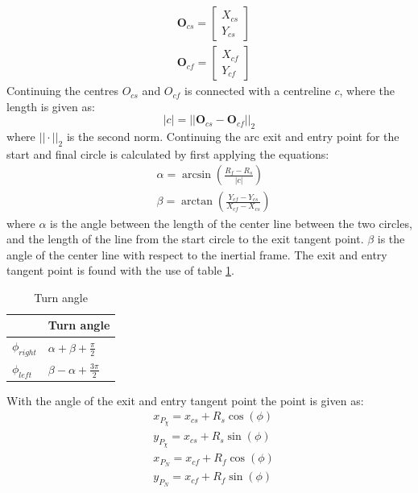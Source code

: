 \begin{align}
& \mathbf{O}_{cs} =
\begin{bmatrix}
X_{cs} \\
Y_{cs}
\end{bmatrix} \\
& \mathbf{O}_{cf} =
\begin{bmatrix}
X_{cf} \\
Y_{cf}
\end{bmatrix}
\end{align}
Continuing the centres $O_{cs}$ and $O_{cf}$ is connected with a centreline $c$, where the length is given as:
\begin{equation}
|c| = ||\mathbf{O}_{cs} - \mathbf{O}_{cf}||_2
\end{equation}
where $||\cdot||_2$ is the second norm. Continuing the arc exit and entry point for the start and final circle is calculated by first applying the equations:
\begin{subequations}
\begin{align}
& \alpha = \arcsin\left(\frac{R_f-R_s}{|c|}\right) \\
& \beta = \arctan\left(\frac{Y_{cf}-Y_{cs}}{X_{cf}-X_{cs}}\right)
\end{align}
\end{subequations}
where $\alpha$ is the angle between the length of the center line between the two circles, and the length of the line from the start circle to the exit tangent point. $\beta$ is the angle of the center line with respect to the inertial frame. The exit and entry tangent point is found with the use of table \ref{Tb:ExitEntryTangent}.
\begin{table}[H]
\begin{center}
\begin{tabular}{ | l | l |}
\hline
& \textbf{Turn angle} \\ \hline
$\phi_{right}$ & $\alpha + \beta + \frac{\pi}{2}$ \\
$\phi_{left}$ & $\beta - \alpha + \frac{3\pi}{2}$ \\ \hline
\end{tabular}
\caption{Turn angle}
\label{Tb:ExitEntryTangent}
\end{center}

\end{table}
With the angle of the exit and entry tangent point the point is given as:
\begin{subequations}
\begin{align}
& x_{P_\chi} = x_{cs} + R_s\cos(\phi) \\
& y_{P_\chi} = x_{cs} + R_s\sin(\phi) \\
& x_{P_N} = x_{cf} + R_f\cos(\phi) \\
& y_{P_N} = x_{cf} + R_f\sin(\phi)
\end{align}
\end{subequations}
